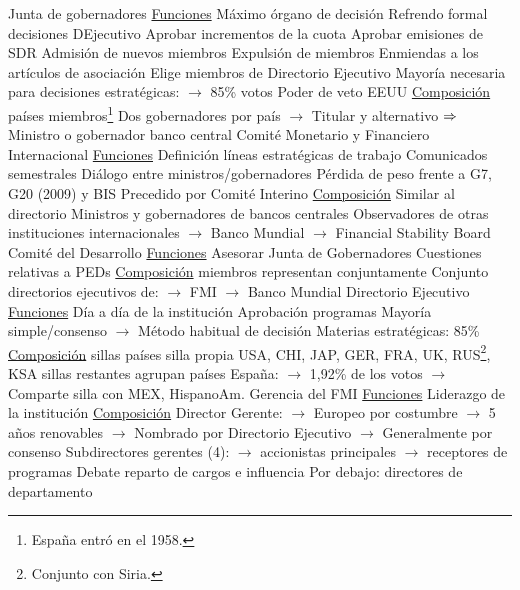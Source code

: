\documentclass{nuevotema}
\begin{document}
\begin{esquemal}
			\3 Junta de gobernadores
				\4 \underline{Funciones}
				\4[] Máximo órgano de decisión
				\4[] Refrendo formal decisiones DEjecutivo
				\4[] Aprobar incrementos de la cuota
				\4[] Aprobar emisiones de SDR
				\4[] Admisión de nuevos miembros
				\4[] Expulsión de miembros
				\4[] Enmiendas a los artículos de asociación
				\4[] Elige miembros de Directorio Ejecutivo
				\4[] Mayoría necesaria para decisiones estratégicas:
				\4[] $\to$ 85\% votos
				\4[] Poder de veto EEUU
				\4 \underline{Composición}
				 países miembros\footnote{España entró en el 1958.}
				\4[] Dos gobernadores por país
				\4[] $\to$ Titular y alternativo
				\4[] $\Rightarrow$ Ministro o gobernador banco central
			\3 Comité Monetario y Financiero Internacional
				\4 \underline{Funciones}
				\4[] Definición líneas estratégicas de trabajo
				\4[] Comunicados semestrales
				\4[] Diálogo entre ministros/gobernadores
				\4[] Pérdida de peso frente a G7, G20 (2009) y BIS
				\4[] Precedido por Comité Interino
				\4 \underline{Composición}
				\4[] Similar al directorio
				\4[] Ministros y gobernadores de bancos centrales
				\4[] Observadores de otras instituciones internacionales
				\4[] $\to$ Banco Mundial
				\4[] $\to$ Financial Stability Board
			\3 Comité del Desarrollo
				\4 \underline{Funciones}
				\4[] Asesorar Junta de Gobernadores
				\4[] Cuestiones relativas a PEDs
				\4 \underline{Composición}
				 miembros representan conjuntamente
				\4 Conjunto directorios ejecutivos de:
				\4[] $\to$ FMI
				\4[] $\to$ Banco Mundial
			\3 Directorio Ejecutivo
				\4 \underline{Funciones}
				\4[] Día a día de la institución
				\4[] Aprobación programas
				\4[] Mayoría simple/consenso
				\4[] $\to$ Método habitual de decisión
				\4[] Materias estratégicas: 85\%
				\4 \underline{Composición}
				 sillas
				 países silla propia
				\4[] USA, CHI, JAP, GER, FRA, UK, RUS\footnote{Conjunto con Siria.}, KSA
				 sillas restantes agrupan países
				\4[] España:
				\4[] $\to$ 1,92\% de los votos
				\4[] $\to$ Comparte silla con MEX, HispanoAm.
			\3 Gerencia del FMI
				\4 \underline{Funciones}
				\4[] Liderazgo de la institución
				\4 \underline{Composición}
				\4[] Director Gerente:
				\4[] $\to$ Europeo por costumbre
				\4[] $\to$ 5 años renovables
				\4[] $\to$ Nombrado por Directorio Ejecutivo
				\4[] $\to$ Generalmente por consenso
				\4[] Subdirectores gerentes (4):
				\4[] $\to$ accionistas principales
				\4[] $\to$ receptores de programas
				\4[] Debate reparto de cargos e influencia
				\4[] Por debajo: directores de departamento

\end{esquemal}
\end{document}
